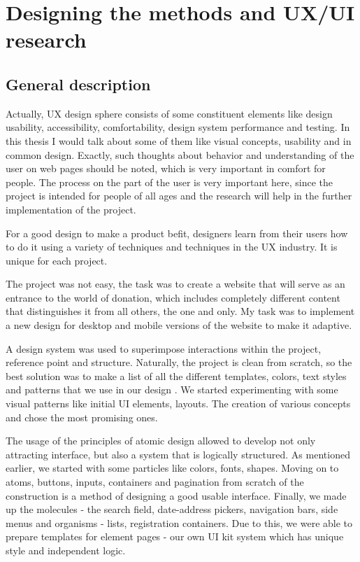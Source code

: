 \chapter{Designing the methods and UX/UI research}\label{ch:A}
\section{General description}
\par
Actually, UX design sphere consists of some constituent elements like design usability, accessibility, comfortability, design system performance and testing. In this thesis I would talk about some of them like visual concepts, usability and in common design. Exactly, such thoughts about behavior and understanding of the user on web pages should be noted, which is very important in comfort for people. The process on the part of the user is very important here, since the project is intended for people of all ages and the research will help in the further implementation of the project. 
\par
For a good design to make a product befit, designers learn from their users how to do it using a variety of techniques and techniques in the UX industry. It is unique for each project.
\par
The project was not easy, the task was to create a website that will serve as an entrance to the world of donation, which includes completely different content that distinguishes it from all others, the one and only. My task was to implement a new design for desktop and mobile versions of the website to make it adaptive.
\par
A design system was used to superimpose interactions within the project, reference point and structure. Naturally, the project is clean from scratch, so the best solution was to make a list of all the different templates, colors, text styles and patterns that we use in our design \cite{eyal}. We started experimenting with some visual patterns like initial UI elements, layouts. The creation of various concepts and chose the most promising ones. 
\par
The usage of the principles of atomic design allowed to develop not only attracting interface, but also a system that is logically structured. As mentioned earlier, we started with some particles like colors, fonts, shapes. Moving on to atoms, buttons, inputs, containers and pagination from scratch of the construction is a method of designing a good usable interface. Finally, we made up the molecules - the search field, date-address pickers, navigation bars, side menus and organisms - lists, registration containers. Due to this, we were able to prepare templates for element pages -  our own UI kit system which has unique style and independent logic. 


